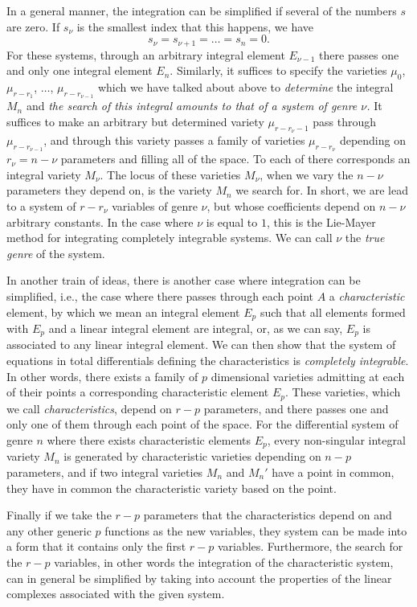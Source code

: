 \documentclass[leqno,11pt]{book}
\theoremstyle{shape1}
\theoremstyle{shapesmall}
\begin{document}
In a general manner, the integration can be simplified if several of the numbers $s$ are zero. If $s_{\nu}$ is the smallest index that this happens, we have
\[
s_{\nu}=s_{\nu+1}=\dots=s_{n}=0.
\]
For these systems, through an arbitrary integral element $E_{\nu-1}$ there passes one and only one integral element $E_{n}$. Similarly, it suffices to specify the varieties $\mu_{0}$, $\mu_{r-r_{1}}$, $\dots$, $\mu_{r-r_{\nu-1}}$ which we have talked about above to \emph{determine} the integral $M_{n}$ and \emph{the search of this integral amounts to that of a system of genre $\nu$.} It suffices to make an arbitrary but determined variety $\mu_{r-r_{\nu}-1}$ pass through $\mu_{r-r_{\nu-1}}$, and through this variety passes a family of varieties $\mu_{r-r_{\nu}}$ depending on $r_{\nu}=n-\nu$ parameters and filling all of the space. To each of there corresponds an integral variety $M_{\nu}$. The locus of these varieties $M_{\nu}$, when we vary the $n-\nu$ parameters they depend on, is the variety $M_{n}$ we search for. In short, we are lead to a system of $r-r_{\nu}$ variables of genre $\nu$, but whose coefficients depend on $n-\nu$ arbitrary constants. In the case where $\nu$ is equal to $1$, this is the Lie-Mayer method for integrating completely integrable systems. We can call $\nu$ the \emph{true genre} of the system.

In another train of ideas, there is another case where integration can be simplified, i.e., the case where there passes through each point $A$ a \emph{characteristic} element, by which we mean an integral element $E_{p}$ such that all elements formed with $E_{p}$ and a linear integral element are integral, or, as we can say, $E_{p}$ is associated to any linear integral element. We can then show that the system of equations in total differentials defining the characteristics is \emph{completely integrable}. In other words, there exists a family of $p$ dimensional varieties admitting at each of their points a corresponding characteristic element $E_{p}$. These varieties, which we call \emph{characteristics}, depend on $r-p$ parameters, and there passes one and only one of them through each point of the space. For the differential system of genre $n$ where there exists characteristic elements $E_{p}$, every non-singular integral variety $M_{n}$ is generated by characteristic varieties depending on $n-p$ parameters, and if two integral varieties $M_{n}$ and $M_{n}'$ have a point in common, they have in common the characteristic variety based on the point.

Finally if we take the $r-p$ parameters that the characteristics depend on and any other generic $p$ functions as the new variables, they system can be made into a form that it contains only the first $r-p$ variables. Furthermore, the search for the $r-p$ variables, in other words the integration of the characteristic system, can in general be simplified by taking into account the properties of the linear complexes associated with the given system.
\end{document}
